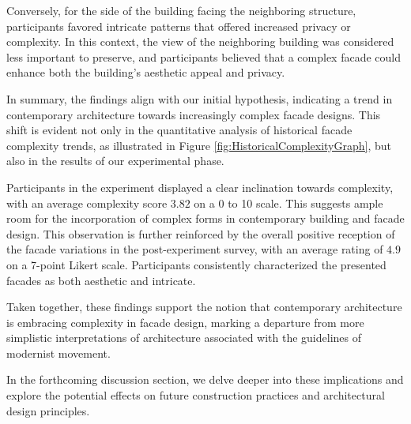 Conversely, for the side of the building facing the neighboring structure, participants favored intricate patterns that offered increased privacy or complexity.
In this context, the view of the neighboring building was considered less important to preserve, and participants believed that a complex facade could enhance both the building's aesthetic appeal and privacy.


In summary, the findings align with our initial hypothesis, indicating a trend in contemporary architecture towards increasingly complex facade designs.
This shift is evident not only in the quantitative analysis of historical facade complexity trends, as illustrated in Figure \ref{fig:HistoricalComplexityGraph}, but also in the results of our experimental phase.

Participants in the experiment displayed a clear inclination towards complexity, with an average complexity score \(3.82\) on a 0 to 10 scale.
This suggests ample room for the incorporation of complex forms in contemporary building and facade design.
This observation is further reinforced by the overall positive reception of the facade variations in the post-experiment survey, with an average rating of \(4.9\) on a 7-point Likert scale.
Participants consistently characterized the presented facades as both aesthetic and intricate.

Taken together, these findings support the notion that contemporary architecture is embracing complexity in facade design, marking a departure from more simplistic interpretations of architecture associated with the guidelines of modernist movement.

In the forthcoming discussion section, we delve deeper into these implications and explore the potential effects on future construction practices and architectural design principles.


